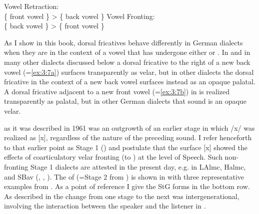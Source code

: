 \ea\label{ex:3:7}%
\begin{multicols}{2}\raggedcolumns
\ea\label{ex:3:7a}Vowel Retraction:\smallskip\\       
     \{ front vowel \} > \{ back vowel \}
\columnbreak
\ex\label{ex:3:7b}Vowel Fronting:\smallskip\\
    \{ back vowel \} > \{ front vowel \}
\z 
\end{multicols}
\z 


As I show in this book, dorsal fricatives behave differently in German dialects when they are in the context of a vowel that has undergone either  or . In  and in many other dialects discussed below a dorsal fricative to the right of a new back vowel (=\ref{ex:3:7a}) surfaces transparently as velar, but in other dialects the dorsal fricative in the context of a new back vowel surfaces instead as an opaque palatal. A dorsal fricative adjacent to a new front vowel (=\ref{ex:3:7b}) in  is realized transparently as palatal, but in other German dialects that sound is an opaque velar.

 as it was described in 1961 was an outgrowth of an earlier stage in which /x/ was realized as [x], regardless of the nature of the preceding sound. I refer henceforth to that earlier point as Stage 1 () and postulate that the surface [x] showed the effects of coarticulatory velar fronting (to ) at the level of Speech. Such non-fronting Stage 1 dialects are attested in the present day, e.g. in LAlmc, Halmc, and SBav (, , ). The  of  (=Stage 2 from ) is shown in  with three representative examples from . As a point of reference I give the StG forms in the bottom row.  As described in  the change from one stage to the next was intergenerational, involving the interaction between the speaker and the listener in .\pagebreak

